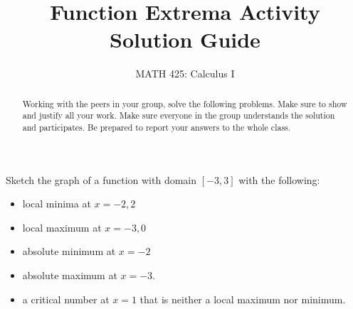 \documentclass{ximera}
\title{Function Extrema Activity Solution Guide}
\author{MATH 425: Calculus I}
\begin{document}
\begin{abstract}
   Working with the peers in your group, solve the following problems. Make sure to show and justify all your work. Make sure everyone in the group understands the solution and participates. Be prepared to report your answers to the whole class. 
\end{abstract}
\maketitle


\begin{exercise}
    Sketch the graph of a function with domain $[-3,3]$ with the following: 
    \begin{itemize}
        \item local minima at $x=-2, 2$
        \item local maximum at $x=-3, 0$
        \item absolute minimum at $x=-2$
        \item absolute maximum at $x=-3$.
        \item a critical number at $x=1$ that is neither a local maximum nor minimum.
    \end{itemize}

    \begin{image}
    \end{image}
\end{exercise}
\end{document}
